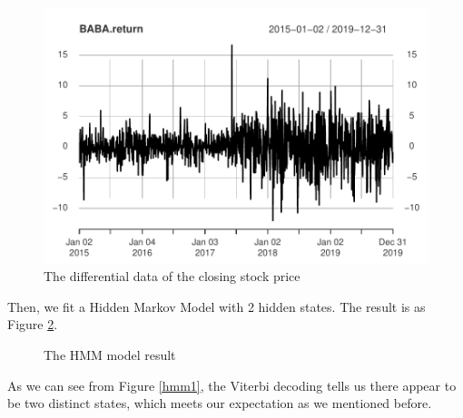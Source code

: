 \documentclass{article}
\begin{document}
\begin{figure}[H]
    \centering
    \includegraphics[width=0.7\linewidth]{images/differential}
    \caption{The differential data of the closing stock price}
    \label{differential}
\end{figure}
Then, we fit a Hidden Markov Model with 2 hidden states. The result is as Figure \ref{hmm}.
\begin{figure}[H]
    \centering
    \quad
    \caption{The HMM model result}
    \label{hmm}
\end{figure}
As we can see from Figure \ref{hmm1}, the Viterbi decoding tells us there appear to be two distinct states, which meets our expectation as we mentioned before.
\end{document}
